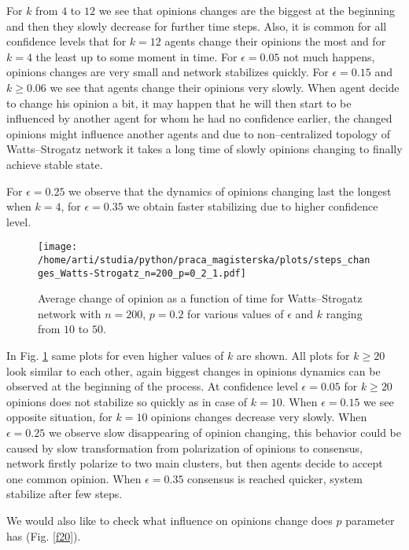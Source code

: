 \documentclass[a4paper, 12pt]{article}
\begin{document}
For $k$ from $4$ to $12$ we see that opinions changes are the biggest at the beginning and then they slowly decrease for further time steps. Also, it is common for all confidence levels that for $k=12$ agents change their opinions the most and for $k=4$ the least up to some moment in time. For $\epsilon=0.05$ not much happens, opinions changes are very small and network stabilizes quickly. For $\epsilon=0.15$ and $k \geq 0.06$ we see that agents change their opinions very slowly. When agent decide to change his opinion a bit, it may happen that he will then start to be influenced by another agent for whom he had no confidence earlier, the changed opinions might influence another agents and due to non--centralized topology of Watts--Strogatz network it takes a long time of slowly opinions changing to finally achieve stable state.
\indent

For $\epsilon=0.25$ we observe that the dynamics of opinions changing last the longest when $k=4$, for $\epsilon=0.35$ we obtain faster stabilizing due to higher confidence level.

\begin{figure}[H]
		\centering
		\texttt{[image: /home/arti/studia/python/praca\_magisterska/plots/steps\_changes\_Watts-Strogatz\_n=200\_p=0\_2\_1.pdf]}
		\caption{Average change of opinion as a function of time for Watts--Strogatz network with $n=200$, $p=0.2$ for various values of $\epsilon$ and $k$ ranging from $10$ to $50$.}
		\label{f19}
\end{figure}

In Fig. \ref{f19} same plots for even higher values of $k$ are shown. All plots for $k \geq 20$ look similar to each other, again biggest changes in opinions dynamics can be observed at the beginning of the process. At confidence level $\epsilon=0.05$ for $k \geq 20$ opinions does not stabilize so quickly as in case of $k=10$. When $\epsilon=0.15$ we see opposite situation, for $k=10$ opinions changes decrease very slowly. When $\epsilon=0.25$ we observe slow disappearing of opinion changing, this behavior could be caused by slow transformation from polarization of opinions to consensus, network firstly polarize to two main clusters, but then agents decide to accept one common opinion. When $\epsilon=0.35$ consensus is reached quicker, system stabilize after few steps.

\indent

We would also like to check what influence on opinions change does $p$ parameter has (Fig. \ref{f20}).
\end{document}
